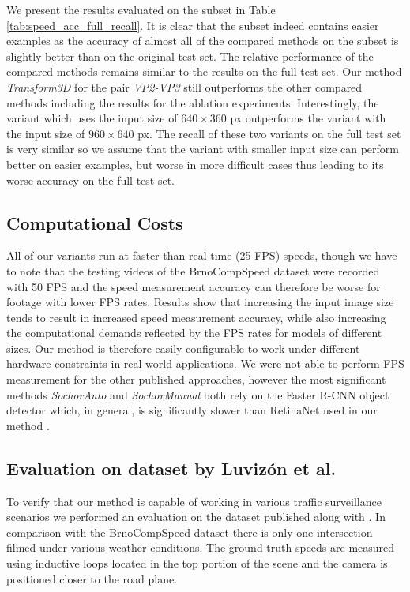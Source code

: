 \documentclass[twocolumn]{svjour3}          \smartqed  \usepackage{graphicx}
\begin{document}
We present the results evaluated on the subset in Table \ref{tab:speed_acc_full_recall}. It is clear that the subset indeed contains easier examples as the accuracy of almost all of the compared methods on the subset is slightly better than on the original test set. The relative performance of the compared methods remains similar to the results on the full test set. Our method \textit{Transform3D} for the pair \textit{VP2-VP3} still outperforms the other compared methods including the results for the ablation experiments. Interestingly, the variant which uses the input size of $640 \times 360$ px outperforms the variant with the input size of $960 \times 640$ px. The recall of these two variants on the full test set is very similar so we assume that the variant with smaller input size can perform better on easier examples, but worse in more difficult cases thus leading to its worse accuracy on the full test set.


\subsection{Computational Costs}

All of our variants run at faster than real-time (25 FPS) speeds, though we have to note that the testing videos of the BrnoCompSpeed dataset were recorded with 50 FPS and the speed measurement accuracy can therefore be worse for footage with lower FPS rates. Results show that increasing the input image size tends to result in increased speed measurement accuracy, while also increasing the computational demands reflected by the FPS rates for models of different sizes. Our method is therefore easily configurable to work under different hardware constraints in real-world applications. We were not able to perform FPS measurement for the other published approaches, however the most significant methods \textit{SochorAuto} and \textit{SochorManual} both rely on the Faster R-CNN object detector which, in general, is significantly slower than RetinaNet used in our method \cite{RetinaNet}.

\subsection{Evaluation on dataset by Luviz\'{o}n et al.}

To verify that our method is capable of working in various traffic surveillance scenarios we performed an evaluation on the dataset published along with \cite{luvizon}. In comparison with the BrnoCompSpeed dataset \cite{brnocompspeed} there is only one intersection filmed under various weather conditions. The ground truth speeds are measured using inductive loops located in the top portion of the scene and the camera is positioned closer to the road plane.
\end{document}
